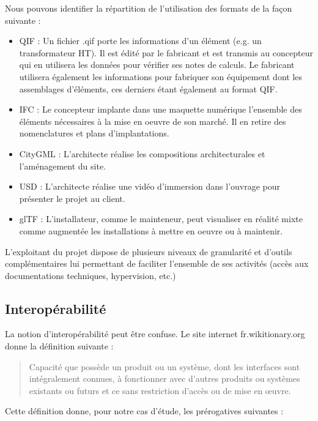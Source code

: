 Nous pouvons identifier la répartition de l'utilisation des formats de la façon suivante :
\begin{itemize}
    \item QIF : Un fichier .qif porte les informations d'un élément (e.g. un transformateur HT). Il est édité par le fabricant et est transmis au concepteur qui en utilisera les données pour vérifier ses notes de calculs. Le fabricant utilisera également les informations pour fabriquer son équipement dont les assemblages d'éléments, ces derniers étant également au format QIF. 
    \item IFC : Le concepteur implante dans une maquette numérique l'ensemble des éléments nécessaires à la mise en oeuvre de son marché. Il en retire des nomenclatures et plans d'implantations.
    \item CityGML : L'architecte réalise les compositions architecturales et l'aménagement du site.
    \item USD : L'architecte réalise une vidéo d'immersion dans l'ouvrage pour présenter le projet au client.
    \item glTF : L'installateur, comme le mainteneur, peut visualiser en réalité mixte comme augmentée les installations à mettre en oeuvre ou à maintenir.
\end{itemize}

L'exploitant du projet dispose de plusieurs niveaux de granularité et d'outils complémentaires lui permettant de faciliter l'ensemble de ses activités (accès aux documentations techniques, hypervision, etc.)

\newpage

\subsection{Interopérabilité}

La notion d'interopérabilité peut être confuse. Le site internet fr.wikitionary.org donne la définition suivante :

\begin{quote}
    Capacité que possède un produit ou un système, dont les interfaces sont intégralement connues, à fonctionner avec d’autres produits ou systèmes existants ou futurs et ce sans restriction d’accès ou de mise en œuvre. 
    \cite{wiktionaryInteroprabilitWiktionnaire}
\end{quote}

Cette définition donne, pour notre cas d'étude, les prérogatives suivantes :

